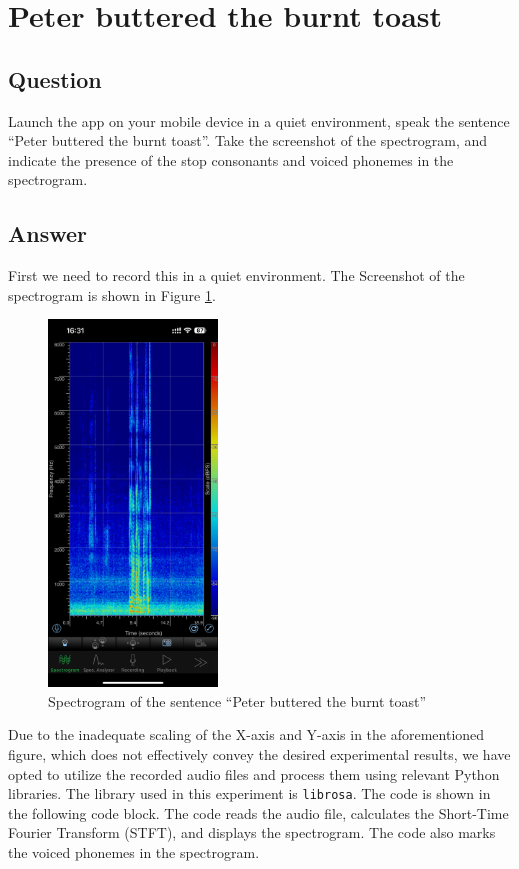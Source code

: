 
\section{Peter buttered the burnt toast}

\subsection{Question}
Launch the app on your mobile device in a quiet environment, speak the sentence “Peter buttered the burnt toast”. Take the screenshot of the spectrogram, and indicate the presence of the stop consonants and voiced phonemes in the spectrogram.

\subsection{Answer}
First we need to record this in a quiet environment. 
The Screenshot of the spectrogram is shown in Figure \ref{fig:Question1}.
\begin{figure}[H]
    \centering
    \includegraphics[width=0.4\textwidth]{./img/IMG_1831.PNG}
    \caption{Spectrogram of the sentence “Peter buttered the burnt toast”}
    \label{fig:Question1}
\end{figure}


Due to the inadequate scaling of the X-axis and Y-axis in the aforementioned figure, which does not effectively convey the desired experimental results, we have opted to utilize the recorded audio files and process them using relevant Python libraries.
The library used in this experiment is \texttt{librosa}. The code is shown in the following code block. The code reads the audio file, calculates the Short-Time Fourier Transform (STFT), and displays the spectrogram. The code also marks the voiced phonemes in the spectrogram.


